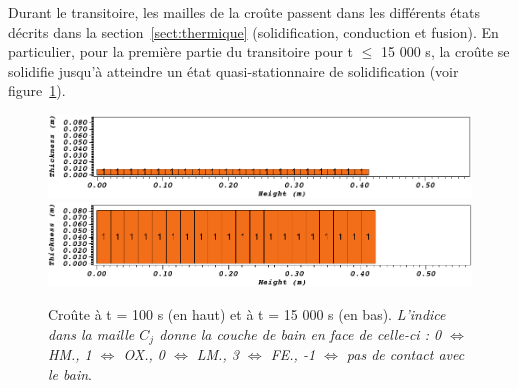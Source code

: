 Durant le transitoire, les mailles de la croûte passent dans les différents états décrits dans la section~\ref{sect:thermique} (solidification, conduction et fusion). En particulier, pour la première partie du transitoire pour t $\leq$ 15 000 s, la croûte se solidifie jusqu'à atteindre un état quasi-stationnaire de solidification (voir figure~\ref{fig:croutes_1}).  
\begin{figure}
\centering
\includegraphics[width=\textwidth, keepaspectratio=true]{Figures/croute_0.png}\\
\includegraphics[width=\textwidth, keepaspectratio=true]{Figures/croute_1.png}
\caption{Croûte à t = 100 s (en haut) et à t = 15 000 s (en bas). \textit{L'indice dans la maille $C_j$ donne la couche de bain en face de celle-ci : 0 $\Leftrightarrow$ HM., 1 $\Leftrightarrow$ OX., 0 $\Leftrightarrow$ LM., 3 $\Leftrightarrow$ FE., -1 $\Leftrightarrow$ pas de contact avec le bain}.}
\label{fig:croutes_1}
\end{figure}

